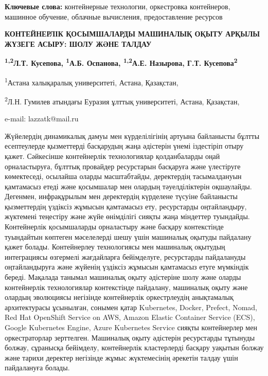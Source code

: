 {\bfseries Ключевые слова:} контейнерные технологии, оркестровка
контейнеров, машинное обучение, облачные вычисления, предоставление
ресурсов

\begin{center}
{\large\bfseries КОНТЕЙНЕРЛІК ҚОСЫМШАЛАРДЫ МАШИНАЛЫҚ ОҚЫТУ АРҚЫЛЫ ЖҮЗЕГЕ АСЫРУ:
ШОЛУ ЖӘНЕ ТАЛДАУ}

{\bfseries \textsuperscript{1,2}Л.Т. Кусепова, \textsuperscript{1}А.Б.
Оспанова, \textsuperscript{1,2}А.Е. Назырова, Г.Т.
Кусепова\textsuperscript{2}}

\textsuperscript{1}Астана халықаралық университеті, Астана, Қазақстан,

\textsuperscript{2}Л.Н. Гумилев атындағы Еуразия ұлттық университеті,
Астана, Қазақстан,

e-mail: lazzatk@mail.ru
\end{center}

Жүйелердің динамикалық дамуы мен күрделілігінің артуына байланысты
бұлтты есептеулерде қызметтерді басқарудың жаңа әдістерін үнемі
іздестіріп отыру қажет. Сәйкесінше контейнерлік технологиялар
қолданбаларды оңай орналастыруға, бұлттық провайдер ресурстарын
басқаруға және үлестіруге көмектеседі, осылайша оларды масштабтайды,
деректердің тасымалдануын қамтамасыз етеді және қосымшалар мен олардың
тәуелділіктерін оқшаулайды. Дегенмен, инфрақұрылым мен деректердің
күрделене түсуіне байланысты қызметтердің үздіксіз жұмысын қамтамасыз
ету, ресурстарды оңтайландыру, жүктемені теңестіру және жүйе өнімділігі
сияқты жаңа міндеттер туындайды. Контейнерлік қосымшаларды орналастыру
және басқару контекстінде туындайтын көптеген мәселелерді шешу үшін
машиналық оқытуды пайдалану қажет болады. Контейнерлеу технологиясы мен
машиналық оқытудың интеграциясы өзгермелі жағдайларға бейімделуге,
ресурстарды пайдалануды оңтайландыруға және жүйенің үздіксіз жұмысын
қамтамасыз етуге мүмкіндік береді. Мақалада танымал машиналық оқыту
әдістеріне шолу және оларды контейнерлік технологиялар контекстінде
пайдалану, машиналық оқыту және олардың эволюциясы негізінде
контейнерлік оркестрлеудің анықтамалық архитектурасы ұсынылған, сонымен
қатар Kubernetes, Docker, Prefect, Nomad, Red Hat OpenShift Service on
AWS, Amazon Elastic Container Service (ECS), Google Kubernetes Engine,
Azure Kubernetes Service сияқты контейнерлер мен оркестраторлар
зерттелген. Машиналық оқыту әдістерін ресурстарды тұтынуды болжау,
сұранысқа бейімделу, контейнерлік кластерлерді басқару уақытын болжау
және тарихи деректер негізінде жұмыс жүктемесінің әрекетін талдау үшін
пайдалануға болады.

